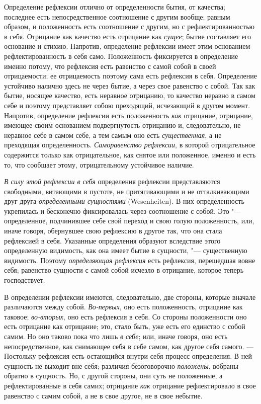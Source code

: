 Определение рефлексии отлично от определенности бытия, от качества;
последнее есть непосредственное соотношение с другим вообще; равным
образом, и положенность есть соотношение с другим, но с рефлектированностью
в себя. Отрицание как качество есть отрицание как
{\em сущее}; бытие составляет его основание и стихию.
Напротив, определение рефлексии имеет этим основанием рефлектированность в
себя само. Положенность фиксируется в определение именно потому, что
рефлексия есть равенство с самой собой в своей отрицаемости; ее
отрицаемость поэтому сама есть рефлексия в себя. Определение устойчиво
налично здесь не через бытие, а через свое равенство с собой. Так как
бытие, носящее качество, есть неравное отрицанию, то качество неравно в
самом себе и поэтому представляет собою преходящий, исчезающий в другом
момент. Напротив, определение рефлексии есть положенность
{\em как} отрицание, отрицание, имеющее своим
основанием подвергнутость отрицанию и, следовательно, не неравное себе в
самом себе, а тем самым оно есть {\em существенная}, а
не преходящая определенность. {\em Саморавенство
рефлексии}, в которой отрицательное содержится только как отрицательное,
как снятое или положенное, именно и есть то, что сообщает этому,
отрицательному устойчивое наличие.

{\em В силу этой рефлексии в себя} определения рефлексии
представляются свободными, витающими в пустоте, не притягивающими и не
отталкивающими друг друга {\em определенными
сущностями} (Wesenheiten). В них определенность укрепилась и бесконечно
фиксировалась через соотношение с собой. Это "--- определенное, подчинившее
себе свой переход и свою голую положенность, или, иначе говоря, обернувшее
свою рефлексию в другое так, что она стала рефлексией в себя. Указанные
определения образуют вследствие этого определенную видимость, как она имеет
бытие в сущности, "--- существенную видимость. Поэтому
{\em определяющая рефлексия} есть рефлексия, перешедшая
вовне себя; равенство сущности с самой собой исчезло в отрицание, которое
теперь господствует.

В определении рефлексии имеются, следовательно, две стороны, которые вначале
различаются между собой. {\em Во-первых}, оно есть
положенность, отрицание как таковое; {\em во-вторых},
оно есть рефлексия в себя. Со стороны положенности оно есть отрицание как
отрицание; это, стало быть, уже есть его единство с собой самим. Но оно
таково пока что лишь {\em в себе}; или, иначе говоря,
оно есть непосредственное, как снимающее себя в себе самом, как другое себя
самого. --- Постольку рефлексия есть остающийся внутри себя процесс
определения. В ней сущность не выходит вне себя; различия безоговорочно
{\em положены}, вобраны обратно в сущность. Но, с
другой стороны, они суть не положенные, а рефлектированные в себя самих;
отрицание {\em как} отрицание рефлектировало в свое
равенство с самим собой, а не в свое другое, не в свое небытие.

